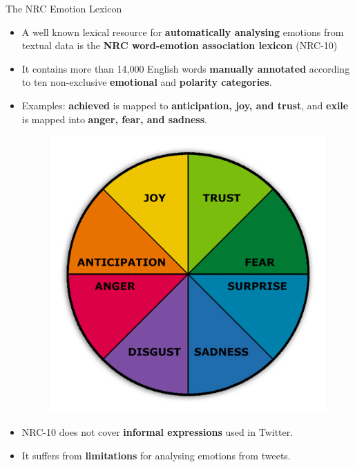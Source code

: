 \documentclass[handout]{beamer}
\begin{document}
\begin{frame}{The NRC Emotion Lexicon}
\begin{scriptsize}\begin{itemize}
 \item A well known lexical resource for \textbf{automatically analysing} emotions from textual data is the \textbf{NRC word-emotion association lexicon} (NRC-10) \cite{Mohammad2013a}
 \item It contains more than 14,000 English words \textbf{manually annotated} according to ten non-exclusive \textbf{emotional} and \textbf{polarity categories}.
 \item Examples: \textbf{achieved} is mapped to \textbf{anticipation, joy, and trust}, and  \textbf{exile} is mapped into \textbf{anger, fear, and sadness}.
 
  \begin{figure}[htb]
	\centering
	 \includegraphics[scale=0.2]{pics/wheel_th.jpg}
\end{figure}
 
 \item  NRC-10 does not cover \textbf{informal expressions} used in Twitter. 
 \item It suffers from \textbf{limitations} for analysing emotions from tweets.
 \end{itemize}
\end{scriptsize}
\end{frame}
\end{document}
